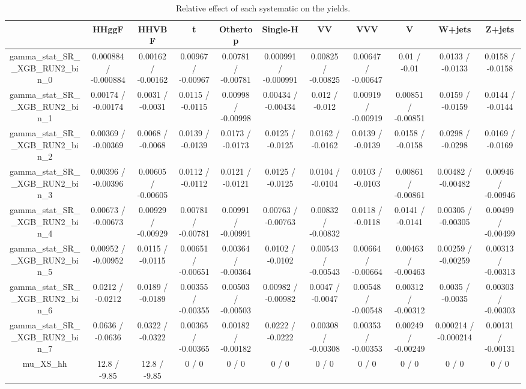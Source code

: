 \documentclass[10pt]{article}
\begin{document}
\begin{table}[htbp]
\begin{center}
\begin{tabular}{|c|c|c|c|c|c|c|c|c|c|c|}
\hline 
      & HHggF      & HHVBF      & t      & Othertop      & Single-H      & VV      & VVV      & V      & W+jets      & Z+jets \\ 
\hline 
  gamma_stat_SR__XGB_RUN2_bin_0 & 0.000884 / -0.000884 & 0.00162 / -0.00162 & 0.00967 / -0.00967 & 0.00781 / -0.00781 & 0.000991 / -0.000991 & 0.00825 / -0.00825 & 0.00647 / -0.00647 & 0.01 / -0.01 & 0.0133 / -0.0133 & 0.0158 / -0.0158 \\ 
  gamma_stat_SR__XGB_RUN2_bin_1 & 0.00174 / -0.00174 & 0.0031 / -0.0031 & 0.0115 / -0.0115 & 0.00998 / -0.00998 & 0.00434 / -0.00434 & 0.012 / -0.012 & 0.00919 / -0.00919 & 0.00851 / -0.00851 & 0.0159 / -0.0159 & 0.0144 / -0.0144 \\ 
  gamma_stat_SR__XGB_RUN2_bin_2 & 0.00369 / -0.00369 & 0.0068 / -0.0068 & 0.0139 / -0.0139 & 0.0173 / -0.0173 & 0.0125 / -0.0125 & 0.0162 / -0.0162 & 0.0139 / -0.0139 & 0.0158 / -0.0158 & 0.0298 / -0.0298 & 0.0169 / -0.0169 \\ 
  gamma_stat_SR__XGB_RUN2_bin_3 & 0.00396 / -0.00396 & 0.00605 / -0.00605 & 0.0112 / -0.0112 & 0.0121 / -0.0121 & 0.0125 / -0.0125 & 0.0104 / -0.0104 & 0.0103 / -0.0103 & 0.00861 / -0.00861 & 0.00482 / -0.00482 & 0.00946 / -0.00946 \\ 
  gamma_stat_SR__XGB_RUN2_bin_4 & 0.00673 / -0.00673 & 0.00929 / -0.00929 & 0.00781 / -0.00781 & 0.00991 / -0.00991 & 0.00763 / -0.00763 & 0.00832 / -0.00832 & 0.0118 / -0.0118 & 0.0141 / -0.0141 & 0.00305 / -0.00305 & 0.00499 / -0.00499 \\ 
  gamma_stat_SR__XGB_RUN2_bin_5 & 0.00952 / -0.00952 & 0.0115 / -0.0115 & 0.00651 / -0.00651 & 0.00364 / -0.00364 & 0.0102 / -0.0102 & 0.00543 / -0.00543 & 0.00664 / -0.00664 & 0.00463 / -0.00463 & 0.00259 / -0.00259 & 0.00313 / -0.00313 \\ 
  gamma_stat_SR__XGB_RUN2_bin_6 & 0.0212 / -0.0212 & 0.0189 / -0.0189 & 0.00355 / -0.00355 & 0.00503 / -0.00503 & 0.00982 / -0.00982 & 0.0047 / -0.0047 & 0.00548 / -0.00548 & 0.00312 / -0.00312 & 0.0035 / -0.0035 & 0.00303 / -0.00303 \\ 
  gamma_stat_SR__XGB_RUN2_bin_7 & 0.0636 / -0.0636 & 0.0322 / -0.0322 & 0.00365 / -0.00365 & 0.00182 / -0.00182 & 0.0222 / -0.0222 & 0.00308 / -0.00308 & 0.00353 / -0.00353 & 0.00249 / -0.00249 & 0.000214 / -0.000214 & 0.00131 / -0.00131 \\ 
  mu_XS_hh & 12.8 / -9.85 & 12.8 / -9.85 & 0 / 0 & 0 / 0 & 0 / 0 & 0 / 0 & 0 / 0 & 0 / 0 & 0 / 0 & 0 / 0 \\ 
\hline 
\end{tabular} 
\caption{Relative effect of each systematic on the yields.} 
\end{center} 
\end{table} 
\end{document}
